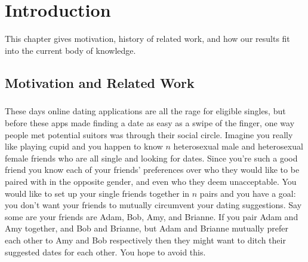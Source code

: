 \chapter{Introduction}
This chapter gives motivation, history of related work, and how our results fit into the current body of knowledge.

\section{Motivation and Related Work}

\paragraph{}
These days online dating applications are all the rage for eligible singles, but before these apps made finding a date as easy as a swipe of the finger, one way people met potential suitors was through their social circle. Imagine you really like playing cupid and you happen to know $n$ heterosexual male and heterosexual female friends who are all single and looking for dates. Since you're such a good friend you know each of your friends' preferences over who they would like to be paired with in the opposite gender, and even who they deem unacceptable. You would like to set up your single friends together in $n$ pairs and you have a goal: you don't want your friends to mutually circumvent your dating suggestions. Say some are your friends are Adam, Bob, Amy, and Brianne. If you pair Adam and Amy together, and Bob and Brianne, but Adam and Brianne mutually prefer each other to Amy and Bob respectively then they might want to ditch their suggested dates for each other. You hope to avoid this.

